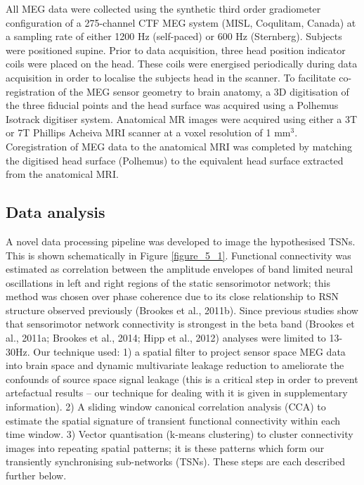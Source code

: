 All MEG data were collected using the synthetic third order gradiometer configuration of a 275-channel CTF MEG system (MISL, Coqulitam, Canada) at a sampling rate of either 1200 Hz (self-paced) or 600 Hz (Sternberg). Subjects were positioned supine. Prior to data acquisition, three head position indicator coils were placed on the head. These coils were energised periodically during data acquisition in order to localise the subjects head in the scanner. To facilitate co-registration of the MEG sensor geometry to brain anatomy, a 3D digitisation of the three fiducial points and the head surface was acquired using a Polhemus Isotrack digitiser system. Anatomical MR images were acquired using either a 3T or 7T Phillips Acheiva MRI scanner at a voxel resolution of 1 mm$^3$. Coregistration of MEG data to the anatomical MRI was completed by matching the digitised head surface (Polhemus) to the equivalent head surface extracted from the anatomical MRI.

\subsection{Data analysis}

A novel data processing pipeline was developed to image the hypothesised TSNs. This is shown schematically in Figure \ref{figure_5_1}. Functional connectivity was estimated as correlation between the amplitude envelopes of band limited neural oscillations in left and right regions of the static sensorimotor network; this method was chosen over phase coherence due to its close relationship to RSN structure observed previously (Brookes et al., 2011b). Since previous studies show that sensorimotor network connectivity is strongest in the beta band (Brookes et al., 2011a; Brookes et al., 2014; Hipp et al., 2012) analyses were limited to 13-30Hz. Our technique used: 1) a spatial filter to project sensor space MEG data into brain space and dynamic multivariate leakage reduction to ameliorate the confounds of source space signal leakage (this is a critical step in order to prevent artefactual results – our technique for dealing with it is given in supplementary information). 2) A sliding window canonical correlation analysis (CCA) to estimate the spatial signature of transient functional connectivity within each time window. 3) Vector quantisation (k-means clustering) to cluster connectivity images into repeating spatial patterns; it is these patterns which form our transiently synchronising sub-networks (TSNs). These steps are each described further below.

